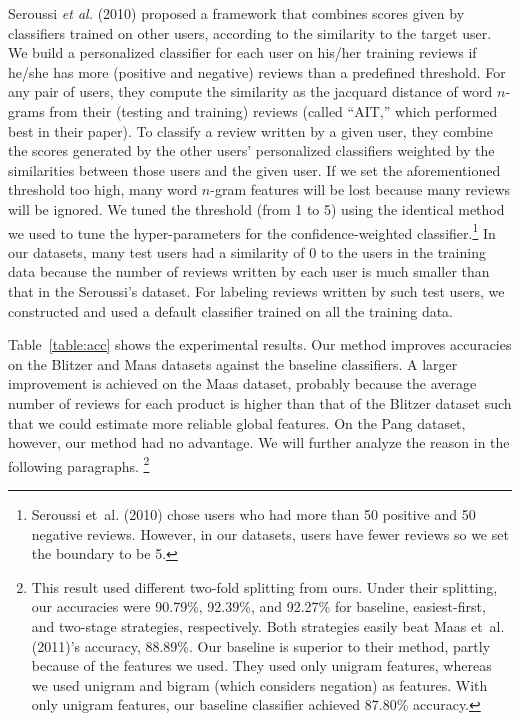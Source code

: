 \documentclass[english]{jnlp_1.4}
\begin{document}
Seroussi {\em et al.} (2010) proposed a framework that combines scores given by classifiers trained on other users, according to the similarity to the target user. 
We build a personalized classifier for each user on his/her training reviews if he/she has more (positive and negative) reviews than a predefined threshold.
For any pair of users, they compute the similarity as the jacquard distance of word $n$-grams from their (testing and training) reviews (called ``AIT,'' which performed best in their paper).
To classify a review written by a given user, they combine the scores generated by the other users' personalized classifiers weighted by the similarities between those users and the given user.
If we set the aforementioned threshold too high, many word $n$-gram features will be lost because many reviews will be ignored.
We tuned the threshold (from 1 to 5) using the identical method we used to tune the hyper-parameters for the confidence-weighted classifier.\footnote{Seroussi et~al. (2010) chose users who had more than 50 positive and 50 negative reviews. However, in our datasets, users have fewer reviews so we set the boundary to be 5.}
In our datasets, many test users had a similarity of 0 to the users in the training data because the number of reviews written by each user is much smaller than that in the Seroussi's dataset.
For labeling reviews written by such test users, we constructed and used a default classifier trained on all the training data.

Table~\ref{table:acc} shows the experimental results. 
Our method improves accuracies on the Blitzer and Maas datasets against the baseline classifiers. 
A larger improvement is achieved on the Maas dataset, probably because the average  number of reviews for each product is higher than that of the Blitzer dataset such that we could estimate more reliable global features. 
On the Pang dataset, however, our method had no advantage.
We will further analyze the reason in the following paragraphs.
{\makeatletter\def\@makefnmark{}
\footnote{This result used different two-fold splitting from ours. Under their splitting, our accuracies were 90.79\%, 92.39\%, and 92.27\% for baseline, easiest-first, and two-stage strategies, respectively. Both strategies easily beat Maas et~al. (2011)'s accuracy, 88.89\%. Our baseline is superior to their method, partly because of the features we used. They used only unigram features, whereas we used unigram and bigram (which considers negation) as features. With only unigram features, our baseline classifier achieved 87.80\% accuracy.}
\makeatother}
\end{document}
